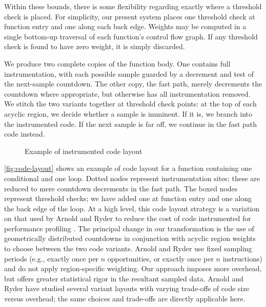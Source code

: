 Within these bounds, there is some flexibility regarding exactly where
a threshold check is placed.  For simplicity, our present system
places one threshold check at function entry and one along each back
edge.  Weights may be computed in a single bottom-up traversal of each
function's control flow graph.  If any threshold check is found to
have zero weight, it is simply discarded.

We produce two complete copies of the function body.  One contains
full instrumentation, with each possible sample guarded by a decrement
and test of the next-sample countdown.  The other copy, the fast path,
merely decrements the countdown where appropriate, but otherwise has
all instrumentation removed.  We stitch the two variants together at
threshold check points: at the top of each acyclic region, we decide
whether a sample is imminent.  If it is, we branch into the
instrumented code.  If the next sample is far off, we continue in the
fast path code instead.


\begin{figure}
  \centering
  
  \caption{Example of instrumented code layout}
  \label{fig:code-layout}
\end{figure}

\autoref{fig:code-layout} shows an example of code layout for a
function containing one conditional and one loop.  Dotted nodes
represent instrumentation sites; these are reduced to mere countdown
decrements in the fast path.  The boxed nodes represent threshold
checks; we have added one at function entry and one along the back
edge of the loop.  At a high level, this code layout strategy is a
variation on that used by Arnold and Ryder to reduce the cost of code
instrumented for performance profiling \cite{Arnold:2001:FRC}.  The
principal change in our transformation is the use of geometrically
distributed countdowns in conjunction with acyclic region weights to
choose between the two code variants.  Arnold and Ryder use fixed
sampling periods (e.g., exactly once per $n$ opportunities, or exactly
once per $n$ instructions) and do not apply region-specific weighting.
Our approach imposes more overhead, but offers greater statistical
rigor in the resultant sampled data.  Arnold and Ryder have studied
several variant layouts with varying trade-offs of code size versus
overhead; the same choices and trade-offs are directly applicable
here.


